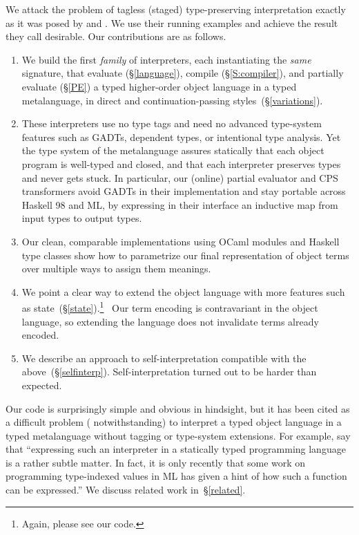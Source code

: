 We attack the problem of tagless (staged) type-preserving
interpretation exactly as it was posed
by \citet{WalidICFP02} and \citet{xi-guarded}.
We use their running examples and achieve the
result they call desirable.  Our contributions are as follows.
\begin{enumerate}
\item We build the first \emph{family} of interpreters, each instantiating the
   \emph{same} signature, that evaluate (\S\ref{language}),
   compile (\S\ref{S:compiler}), and 
   partially evaluate (\S\ref{PE}) a typed higher-order object language
   in a typed metalanguage, in direct and continuation\hyp passing
   styles\ifshort\else\ (\S\ref{variations})\fi.
\item These interpreters use no type tags
    and need no advanced type-system features such as GADTs, dependent types,
    or intentional type analysis.
    Yet the type system of the metalanguage
    assures statically that each object program is well-typed and closed,
    and that each interpreter preserves types and never gets stuck.
    In particular, our (online) partial evaluator and CPS transformers
    avoid GADTs in their implementation and stay portable across
    Haskell 98 and ML, by expressing in their interface an inductive
    map from input types to output types.
\item Our clean, comparable implementations using OCaml modules and Haskell
    type classes show how to parametrize our final representation of object
    terms over multiple ways to assign them meanings.
\item We point a clear way to extend the object language with more features
    such as state\ifshort\else~(\S\ref{state})\fi.\ifshort\footnote{Again, please see our code.}\fi
    \ Our term encoding is contravariant in the object language, so
    extending the language does not invalidate terms already encoded.
\item We describe an approach to self\hyp interpretation compatible with the
  above\ifshort\else~(\S\ref{selfinterp})\fi.  Self\hyp interpretation turned
  out to be harder than expected.\ifshort\footnotemark[\value{footnote}]\fi
\end{enumerate}
Our code is surprisingly simple and obvious in hindsight, but
it has been cited as a difficult problem (\cite{sumii-hybrid}
notwithstanding) to interpret a typed object language in a typed metalanguage
without tagging or type\hyp system extensions.  For example, \citet{taha-tag}
say that ``expressing such an interpreter in a statically typed
programming language is a rather subtle matter. In fact, it is only
recently that some work on programming type-indexed values in ML
\citep{yang-encoding} has given a hint of how such a function can be
expressed.''  We discuss related work in~\S\ref{related}.

